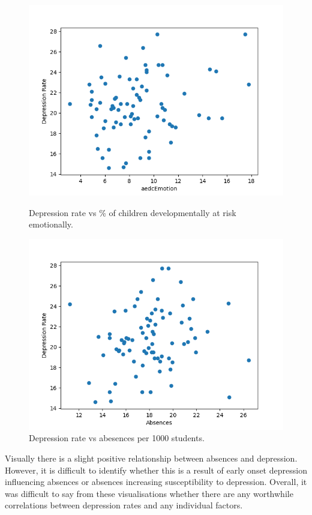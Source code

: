 \documentclass[a4, 11pt]{article}
\begin{document}
\begin{figure}[ht]
    \centering
    \begin{minipage}[b]{0.46\linewidth}
        \centering
        \includegraphics[width=0.9\linewidth]{./plots/depression/aedcEmotion.png}
        \caption{Depression rate vs \% of children developmentally at risk emotionally.}
        \label{fig:minipage1}
    \end{minipage}
    \quad
    \begin{minipage}[b]{0.46\linewidth}
        \centering
        \includegraphics[width=0.9\linewidth]{./plots/depression/Absences.png}
        \caption{Depression rate vs abesences per 1000 students.}
        \label{fig:minipage2}
    \end{minipage}
\end{figure}

Visually there is a slight positive relationship between absences and depression. However, it is difficult to identify whether this is a result of early onset depression influencing absences or absences increasing susceptibility to depression. Overall, it was difficult to say from these visualisations whether there are any worthwhile correlations between depression rates and any individual factors.
\end{document}
